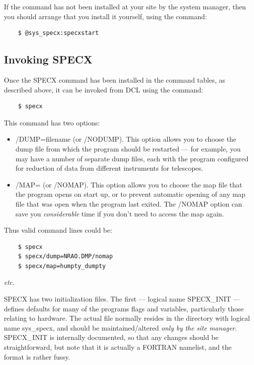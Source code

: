 \documentclass[11pt,twoside]{report}
\newcommand{\etc}{{\it etc.\,}}
\begin{document}
If the command has not been installed at your site by the system manager,
then you should arrange that you install it yourself, using the command:
\begin{verbatim}
    $ @sys_specx:specxstart
\end{verbatim}

\subsection{Invoking SPECX}

Once the SPECX command has been installed in the command tables, as described
above, it can be invoked from DCL using the command: 
\begin{verbatim}
    $ specx
\end{verbatim}
This command has two options:
\begin{itemize}
\item /DUMP=filename (or /NODUMP). This option
  allows you to choose the dump file from which the program should be restarted
  --- for example, you may have a number of separate dump files, each with the
  program configured for reduction of data from different instruments for
  telescopes. \item /MAP= (or /NOMAP). This option
  allows you to choose the map file that the program opens on start up, or to
  prevent automatic opening of any map file that was open when the program last
  exited. The /NOMAP option can save you {\em considerable} time if you don't
  need to access the map again. 
\end{itemize}

Thus valid command lines could be:
\begin{verbatim}
    $ specx
    $ specx/dump=NRAO.DMP/nomap
    $ specx/map=humpty_dumpty
\end{verbatim}
\etc

SPECX has two initialization files. The first ---
logical name SPECX\_INIT 
--- defines defaults for many of the
programs flags and variables, particularly those relating to hardware. The
actual file normally resides in the directory with logical name sys\_specx, and
should be maintained/altered {\em only by the site manager}. SPECX\_INIT is
internally documented, so that any changes should be straightforward, but note
that it is actually a FORTRAN namelist, and the format is rather fussy. 
\end{document}
